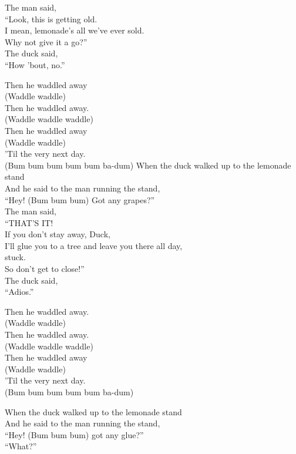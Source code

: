 The man said,\\
``Look, this is getting old.\\
I mean, lemonade's all we've ever sold.\\
Why not give it a go?''\\
The duck said,\\
``How 'bout, no.''\par
\vspace{10pt}
Then he waddled away\\
(Waddle waddle)\\
Then he waddled away.\\
(Waddle waddle waddle)\\
Then he waddled away\\
(Waddle waddle)\\
'Til the very next day.\\
(Bum bum bum bum bum ba-dum)
\newpage
When the duck walked up to the lemonade stand\\
And he said to the man running the stand,\\
``Hey! (Bum bum bum) Got any grapes?''\\
The man said,\\
``THAT’S IT!\\
If you don't stay away, Duck,\\
I'll glue you to a tree and leave you there all day,\\
stuck.\\
So don't get to close!''\\
The duck said,\\
``Adios.''\par
\vspace{10pt}
Then he waddled away.\\
(Waddle waddle)\\
Then he waddled away.\\
(Waddle waddle waddle)\\
Then he waddled away\\
(Waddle waddle)\\
'Til the very next day.\\
(Bum bum bum bum bum ba-dum)\par
\vspace{10pt}
When the duck walked up to the lemonade stand\\
And he said to the man running the stand,\\
``Hey! (Bum bum bum) got any glue?''\\
``What?''\\
